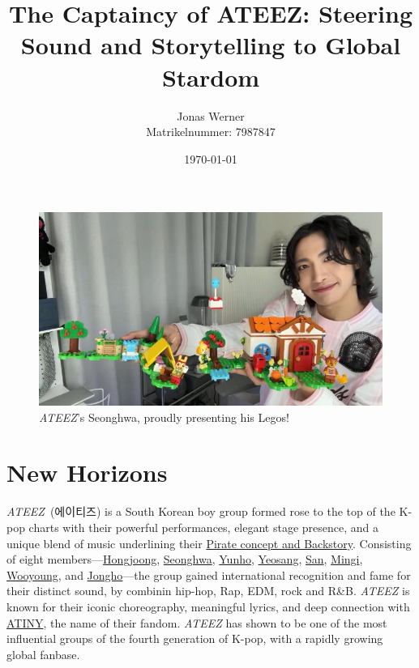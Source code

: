 \documentclass[a4paper,12pt]{article}
\title{The Captaincy of ATEEZ: Steering Sound and Storytelling to Global Stardom}
\author{Jonas Werner\\ Matrikelnummer: 7987847}
\date{\today}
\begin{document}
\renewcommand{\rmdefault}{cmss}

\maketitle

\pagebreak
\tableofcontents

\vspace{2cm}

\begin{figure}[H]
    \centering
    \includegraphics[width=0.6\linewidth]{images/seonghwa_lego.jpg}
    \caption{\textit{ATEEZ}'s Seonghwa, proudly presenting his Legos!}
    \label{fig:enter-label}
\end{figure}

\pagebreak

\section{New Horizons}
\lettrine[lines=2]{\textit{ATEEZ}} \ (에이티즈) is a South Korean boy group formed rose to the top of the K-pop charts with their powerful performances, elegant stage presence, and a unique blend of music underlining their \hyperref[sec:backstory]{Pirate concept and Backstory}. Consisting of eight members—\hyperref[sec:memberhongjoong]{Hongjoong}, \hyperref[sec:memberseonghwa]{Seonghwa}, \hyperref[sec:memberyunho]{Yunho}, \hyperref[sec:memberyeosang]{Yeosang}, \hyperref[sec:membersan]{San}, \hyperref[sec:membermingi]{Mingi}, \hyperref[sec:memberwooyoung]{Wooyoung}, and \hyperref[sec:memberjongho]{Jongho}—the group gained international recognition and fame for their distinct sound, by combinin hip-hop, Rap, EDM, rock and R\&B. \textit{ATEEZ} is known for their iconic choreography, meaningful lyrics, and deep connection with \hyperref[sec:atiny]{ATINY}, the name of their fandom. \textit{ATEEZ} has shown to be one of the most influential groups of the fourth generation of K-pop, with a rapidly growing global fanbase.
\end{document}
